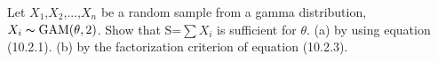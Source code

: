 %






%

\begin{flushleft}               %

  \end{flushleft}

\vspace{1cm}

\begin{exercise1}
  Let $X_1$,$X_2$,...,$X_n$ be a random sample from a gamma distribution, $X_i\thicksim\mathrm{GAM}(\theta,2)$. Show that S=$\sum{X_i}$ is sufficient for $\theta$.\newline
  (a) by using equation (10.2.1).\newline
  (b) by the factorization criterion of equation (10.2.3).
\end{exercise1}

